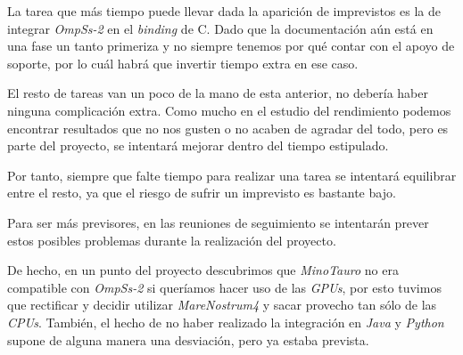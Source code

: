 La tarea que más tiempo puede llevar dada la aparición de imprevistos es la de integrar \textit{OmpSs-2} en el \textit{binding} de C. Dado que la documentación aún está en una fase un tanto primeriza y no siempre tenemos por qué contar con el apoyo de soporte, por lo cuál habrá que invertir tiempo extra en ese caso. 
\par\medskip
El resto de tareas van un poco de la mano de esta anterior, no debería haber ninguna complicación extra. Como mucho en el estudio del rendimiento podemos encontrar resultados que no nos gusten o no acaben de agradar del todo, pero es parte del proyecto, se intentará mejorar dentro del tiempo estipulado. 
\par\medskip
Por tanto, siempre que falte tiempo para realizar una tarea se intentará equilibrar entre el resto, ya que el riesgo de sufrir un imprevisto es bastante bajo.
\par\bigskip
Para ser más previsores, en las reuniones de seguimiento se intentarán prever estos posibles problemas durante la realización del proyecto. 

De hecho, en un punto del proyecto descubrimos que \textit{MinoTauro} no era compatible con \textit{OmpSs-2} si queríamos hacer uso de las \textit{GPUs}, por esto tuvimos que rectificar y decidir utilizar \textit{MareNostrum4} y sacar provecho tan sólo de las \textit{CPUs}. También, el hecho de no haber realizado la integración en \textit{Java} y \textit{Python} supone de alguna manera una desviación, pero ya estaba prevista.


















